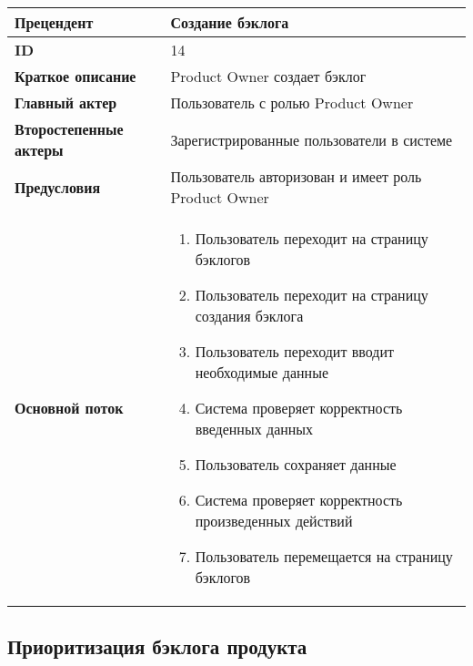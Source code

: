 \documentclass[14pt,a4paper]{extarticle}
\begin{document}
\begin{tabular}{|l|p{9cm}|}
	\hline
	\textbf{Прецендент}            & Создание бэклога                                              		      \\
	\hline
	\textbf{ID}                    & 14                                                                           \\
	\hline
	\textbf{Краткое описание}      & Product Owner создает бэклог                		     		      \\
	\hline
	\textbf{Главный актер}         & Пользователь с ролью Product Owner                                           \\
	\hline
	\textbf{Второстепенные актеры} & Зарегистрированные пользователи в системе                                    \\
	\hline
	\textbf{Предусловия}           & Пользователь авторизован и имеет роль Product Owner                          \\
	\hline
	\textbf{Основной поток}        & \begin{enumerate}
		                                 \item Пользователь переходит на страницу бэклогов
						 \item Пользователь переходит на страницу создания бэклога
					         \item Пользователь переходит вводит необходимые данные
						 \item Система проверяет корректность введенных данных
					         \item Пользователь сохраняет данные
		                                 \item Система проверяет корректность произведенных действий
					         \item Пользователь перемещается на страницу бэклогов
	                                 \end{enumerate} \\
	\hline
\end{tabular}

\subsection{Приоритизация бэклога продукта}
\end{document}
